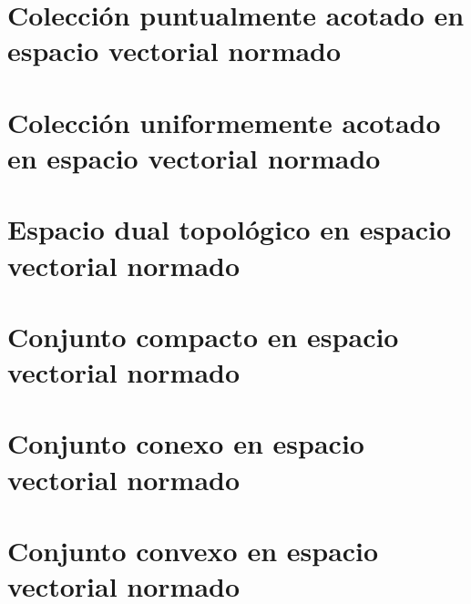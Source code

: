 \section{Colección puntualmente acotado en espacio vectorial normado}

\section{Colección uniformemente acotado en espacio vectorial normado}

\section{Espacio dual topológico en espacio vectorial normado}

\section{Conjunto compacto en espacio vectorial normado}

\section{Conjunto conexo en espacio vectorial normado}

\section{Conjunto convexo en espacio vectorial normado}